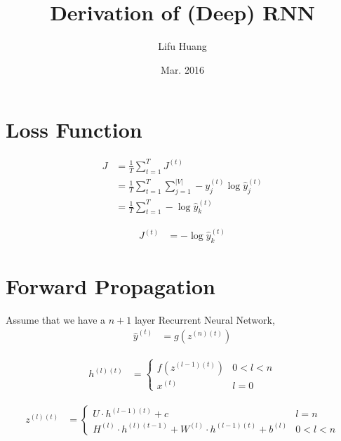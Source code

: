 \documentclass{article}
\title{Derivation of (Deep) RNN}
\author{Lifu Huang}
\date{Mar. 2016}
\begin{document}
	\maketitle
	\section{Loss Function}
	\begin{equation}
	\begin{aligned}
		J &= \frac{1}{T}\sum_{t=1}^{T} J^{(t)} \\
		&= \frac{1}{T}\sum_{t=1}^{T} \sum_{j=1}^{|V|} -y^{(t)}_j \log \hat{y}^{(t)}_j \\
		&= \frac{1}{T} \sum_{t=1}^T -\log{\hat{y}_k^{(t)}}	
	\end{aligned}
	\end{equation}
	
	\begin{equation}
	\begin{aligned}	
		J^{(t)} &= -\log{\hat{y}^{(t)}_k}
	\end{aligned}
	\end{equation}
	
	\section{Forward Propagation}
	Assume that we have a $n+1$ layer Recurrent Neural Network,
	\begin{equation}
	\begin{aligned}
		\hat{y}^{(t)} &= g(z^{(n)(t)}) 
	\end{aligned}	
	\end{equation}
	
	\begin{equation}
	\begin{aligned}
		h^{(l)(t)} &= 
		\begin{cases}
			f(z^{(l-1)(t)}) &0 < l < n\\
			x^{(t)} &l = 0
		\end{cases}	
	\end{aligned}	
	\end{equation}
	
	\begin{equation}
	\begin{aligned}
		z^{(l)(t)} &= 
		\begin{cases}
			U \cdot h^{(l-1)(t)} + c &l = n\\
			H^{(l)} \cdot h^{(l)(t-1)} + W^{(l)} \cdot h^{(l-1)(t)} + b^{(l)} &0 < l < n
		\end{cases}
	\end{aligned}
	\end{equation}
	\newpage
\end{document}
